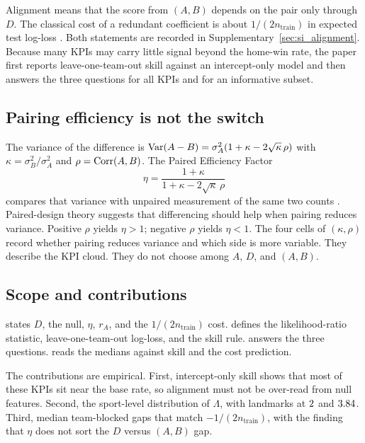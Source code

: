 Alignment means that the score from $(A,B)$ depends on the pair only through $D$.
The classical cost of a redundant coefficient is about $1/(2n_{\mathrm{train}})$ in expected test log-loss \parencite{akaike1973,stone1977}.
Both statements are recorded in Supplementary~\cref{sec:si_alignment}.
Because many KPIs may carry little signal beyond the home-win rate, the paper first reports leave-one-team-out skill against an intercept-only model and then answers the three questions for all KPIs and for an informative subset.

\subsection{Pairing efficiency is not the switch}

The variance of the difference is $\operatorname{Var}(A-B)=\sigma_A^2(1+\kappa-2\sqrt{\kappa}\,\rho)$ with $\kappa=\sigma_B^2/\sigma_A^2$ and $\rho=\operatorname{Corr}(A,B)$.
The Paired Efficiency Factor
\begin{equation}
  \eta = \frac{1+\kappa}{1+\kappa-2\sqrt{\kappa}\,\rho}
  \label{eq:pef}
\end{equation}
compares that variance with unpaired measurement of the same two counts \parencite{fisher1935}.
Paired-design theory suggests that differencing should help when pairing reduces variance.
Positive $\rho$ yields $\eta>1$; negative $\rho$ yields $\eta<1$.
The four cells of $(\kappa,\rho)$ record whether pairing reduces variance and which side is more variable.
They describe the KPI cloud.
They do not choose among $A$, $D$, and $(A,B)$.

\subsection{Scope and contributions}

 states $D$, the null, $\eta$, $r_A$, and the $1/(2n_{\mathrm{train}})$ cost.
 defines the likelihood-ratio statistic, leave-one-team-out log-loss, and the skill rule.
 answers the three questions.
 reads the medians against skill and the cost prediction.

The contributions are empirical.
First, intercept-only skill shows that most of these KPIs sit near the base rate, so alignment must not be over-read from null features.
Second, the sport-level distribution of $\Lambda$, with landmarks at $2$ and $3.84$.
Third, median team-blocked gaps that match $-1/(2n_{\mathrm{train}})$, with the finding that $\eta$ does not sort the $D$ versus $(A,B)$ gap.
